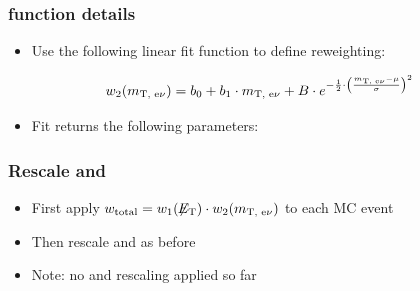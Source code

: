 \documentclass[bigger]{beamer}
\begin{document}
\begin{frame}
\frametitle{\mt function details}
\label{sec-1-9-7}
\label{sec-1-9-7-1}

\centering
\begin{itemize}
\item Use the following linear fit function to define \mt reweighting:
\end{itemize}
\centering
\begin{equation*}
w_2(m_{\text{T, e}\nu}) = b_{0} + b_{1}\cdot m_{\text{T, e}\nu} + B \cdot e^{-\frac{1}{2}\cdot\left(\frac{m_{\text{T, e}\nu}-\mu}{\sigma}\right)^2} 
\end{equation*}
\begin{itemize}
\item Fit returns the following parameters:
\end{itemize}
\end{frame}
\begin{frame}
\frametitle{Rescale \wjets and \ttbar}
\label{sec-1-9-8}
\label{sec-1-9-8-1}

\begin{itemize}
\item First apply $w_{\text{total}} = w_1(\not\!\!{E_{\text{T}}}) \cdot w_2(m_{\text{T, e}\nu})$ to each MC event
\item Then rescale \wjets and \ttbar as before
\item Note: no \wjets and \ttbar rescaling applied so far
\end{itemize}
\label{sec-1-9-8-2}

\end{frame}
\end{document}
